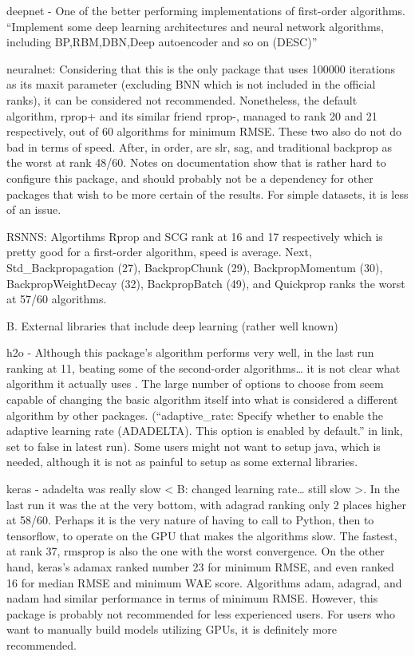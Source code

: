 deepnet - One of the better performing implementations of first-order
algorithms. ``Implement some deep learning architectures and neural
network algorithms, including BP,RBM,DBN,Deep autoencoder and so on
(DESC)''

neuralnet: Considering that this is the only package that uses 100000
iterations as its maxit parameter (excluding BNN which is not included
in the official ranks), it can be considered not recommended.
Nonetheless, the default algorithm, rprop+ and its similar friend
rprop-, managed to rank 20 and 21 respectively, out of 60 algorithms for
minimum RMSE. These two also do not do bad in terms of speed. After, in
order, are slr, sag, and traditional backprop as the worst at rank
48/60. Notes on documentation show that is rather hard to configure this
package, and should probably not be a dependency for other packages that
wish to be more certain of the results. For simple datasets, it is less
of an issue.

RSNNS: Algortihms Rprop and SCG rank at 16 and 17 respectively which is
pretty good for a first-order algorithm, speed is average. Next,
Std\_Backpropagation (27), BackpropChunk (29), BackpropMomentum (30),
BackpropWeightDecay (32), BackpropBatch (49), and Quickprop ranks the
worst at 57/60 algorithms.

B. External libraries that include deep learning (rather well known)

h2o - Although this package's algorithm performs very well, in the last
run ranking at 11, beating some of the second-order algorithms\ldots{}
it is not clear what algorithm it actually uses . The large number of
options to choose from seem capable of changing the basic algorithm
itself into what is considered a different algorithm by other packages.
(``adaptive\_rate: Specify whether to enable the adaptive learning rate
(ADADELTA). This option is enabled by default.'' in link, set to false
in latest run). Some users might not want to setup java, which is
needed, although it is not as painful to setup as some external
libraries.

keras - adadelta was really slow \textless{} B: changed learning
rate\ldots{} still slow \textgreater. In the last run it was the at the
very bottom, with adagrad ranking only 2 places higher at 58/60. Perhaps
it is the very nature of having to call to Python, then to tensorflow,
to operate on the GPU that makes the algorithms slow. The fastest, at
rank 37, rmsprop is also the one with the worst convergence. On the
other hand, keras's adamax ranked number 23 for minimum RMSE, and even
ranked 16 for median RMSE and minimum WAE score. Algorithms adam,
adagrad, and nadam had similar performance in terms of minimum RMSE.
However, this package is probably not recommended for less experienced
users. For users who want to manually build models utilizing GPUs, it is
definitely more recommended.

